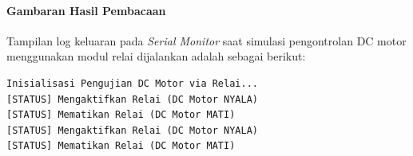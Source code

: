 \paragraph{Gambaran Hasil Pembacaan}
Tampilan log keluaran pada \textit{Serial Monitor} saat simulasi pengontrolan DC motor menggunakan modul relai dijalankan adalah sebagai berikut:

\begin{verbatim}
Inisialisasi Pengujian DC Motor via Relai...
[STATUS] Mengaktifkan Relai (DC Motor NYALA)
[STATUS] Mematikan Relai (DC Motor MATI)
[STATUS] Mengaktifkan Relai (DC Motor NYALA)
[STATUS] Mematikan Relai (DC Motor MATI)
\end{verbatim}
